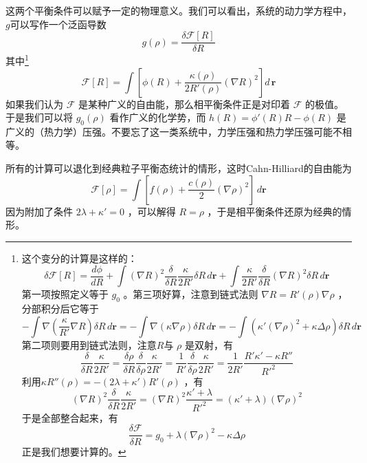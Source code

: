 \documentclass{ctexart}
\begin{document}
这两个平衡条件可以赋予一定的物理意义。我们可以看出，系统的动力学方程中，$g$可以写作一个泛函导数
\begin{equation}
g(\rho)=\frac{\delta\mathcal{F}[R]}{\delta R}
\end{equation}
其中\footnote{这个变分的计算是这样的：
\begin{equation}
\delta\mathcal{F}[R]=\frac{d\phi}{dR}+\int(\nabla R)^2\frac{\delta}{\delta R}\frac{\kappa}{2R'}\delta R\, d\bm{r}+\int\frac{\kappa}{2R'}\frac{\delta}{\delta R}(\nabla R)^2\delta R\, d\bm{r}
\end{equation}
第一项按照定义等于 $g_0$ 。第三项好算，注意到链式法则 $\nabla R=R'(\rho)\nabla\rho$ ，分部积分后它等于
\begin{equation}
-\int\nabla\left(\frac{\kappa}{R'}\nabla R\right)\delta R\,d\bm{r}=-\int\nabla\left(\kappa\nabla \rho\right)\delta R\,d\bm{r}=-\int\left(\kappa'(\nabla \rho)^2+\kappa\Delta\rho\right)\delta R\,d\bm{r}
\end{equation}
第二项则要用到链式法则，注意$R$与 $\rho$ 是双射，有
\begin{equation}
\frac{\delta}{\delta R}\frac{\kappa}{2R'}=\frac{\delta\rho}{\delta R}\frac{\delta}{\delta \rho}\frac{\kappa}{2R'}=\frac{1}{R'}\frac{\delta}{\delta \rho}\frac{\kappa}{2R'}=\frac{1}{2R'}\frac{R'\kappa'-\kappa R''}{R'^2}
\end{equation}
利用$\kappa R''(\rho)=-(2\lambda+\kappa')R'(\rho)$ ，有
\begin{equation}
(\nabla R)^2\frac{\delta}{\delta R}\frac{\kappa}{2R'}=(\nabla R)^2\frac{\kappa'+\lambda}{R'^2}=(\kappa'+\lambda)(\nabla \rho)^2
\end{equation}
于是全部整合起来，有
\begin{equation}
\frac{\delta\mathcal{F}}{\delta R}=g_0+\lambda(\nabla\rho)^2-\kappa\Delta\rho
\end{equation}
正是我们想要计算的。}
\begin{equation}
\mathcal{F}[R]=\int[\phi(R)+\frac{\kappa(\rho)}{2R'(\rho)}(\nabla R)^2]d\,\bm{r}
\end{equation}
如果我们认为 $\mathcal{F}$ 是某种广义的自由能，那么相平衡条件正是对印着 $\mathcal{F}$ 的极值。于是我们可以将  $g_0(\rho)$ 看作广义的化学势，而 $h(R)=\phi'(R)R-\phi(R)$ 是广义的（热力学）压强。不要忘了这一类系统中，力学压强和热力学压强可能不相等。

所有的计算可以退化到经典粒子平衡态统计的情形，这时Cahn-Hilliard的自由能为
\begin{equation}
\mathcal{F}[\rho]=\int[f(\rho)+\frac{c(\rho)}{2}(\nabla\rho)^2]\,d\bm{r}
\end{equation}
因为附加了条件 $2\lambda+\kappa'=0$ ，可以解得 $R=\rho$ ，于是相平衡条件还原为经典的情形。
\end{document}
